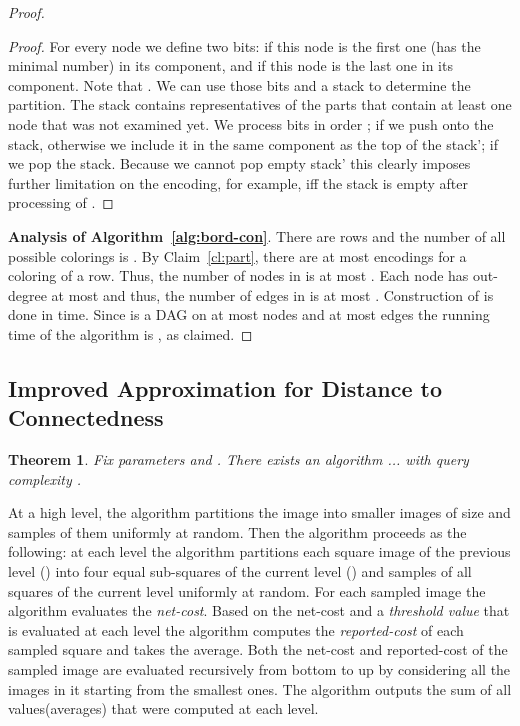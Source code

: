 \documentclass[11pt,english]{article}
\newtheorem{theorem}{Theorem}[section]
\numberwithin{figure}{section}
\begin{document}
\begin{proof}
\begin{proof}
For every node  we define two bits:  if this node is the first one
(has the minimal number) in its component, and  if this node is the
last one in its component.  Note that .  We can use those bits
and a stack to determine the partition.  The stack contains representatives of
the parts that contain at least one node that was not examined yet.  We process
bits in order ; if  we push  onto
the stack, otherwise we include it in the same component as the top of the
stac{k'}; if  we pop the stack.  Because we cannot pop empty stac{k'} this
clearly imposes further limitation on the encoding, for example,  iff
the stack is empty after processing of .
\end{proof}



{\bf Analysis of Algorithm~\ref{alg:bord-con}}. There are  rows and the number of all possible colorings is . By Claim~\ref{cl:part}, there are at most  encodings for a coloring of a row. Thus, the number of nodes in  is at most . Each node has out-degree at most  and thus, the number of edges in  is at most . Construction of  is done in  time. Since  is a DAG on at most  nodes and at most  edges the running time of the algorithm is , as claimed.
\end{proof}



\fi




\iffalse
\subsection{Improved Approximation for Distance to Connectedness}\label{sec:improved-approximation-for-connectedness}
\begin{theorem}
Fix parameters  and . There exists an algorithm ...
with query complexity .
\end{theorem}
At a high level, the algorithm partitions the image into smaller images of size  and samples  of them uniformly at random. Then the algorithm proceeds as the following: at each level  the algorithm partitions each square image of the previous level () into four equal sub-squares of the current level () and samples  of all squares of the current level uniformly at random. For each sampled image the algorithm evaluates the \emph{net-cost}. Based on the net-cost and a \emph{threshold value} that is evaluated at each level the algorithm computes the \emph{reported-cost} of each sampled square and takes the average. Both the net-cost and reported-cost of the sampled image are evaluated recursively from bottom to up by considering all the images in it starting from the smallest ones. The algorithm outputs the sum of all values(averages) that were computed at each level.
\end{document}

